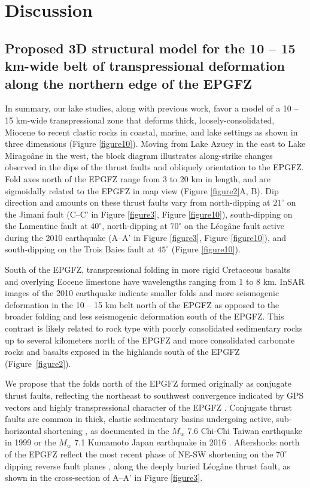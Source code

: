 \documentclass[linenumbers,draft]{agujournal}
\begin{document}
\section{Discussion}
\subsection{Proposed 3D structural model for the 10 -- 15 km-wide belt of transpressional deformation along the northern edge of the EPGFZ}
In summary, our lake studies, along with previous work, favor a model of a 10 -- 15 km-wide transpressional zone that deforms thick, loosely-consolidated, Miocene to recent clastic rocks in coastal, marine, and lake settings as shown in three dimensions (Figure \ref{figure10}). Moving from Lake Azuey in the east to Lake Mirago\^ane in the west, the block diagram illustrates along-strike changes observed in the dips of the thrust faults and obliquely orientation to the EPGFZ. Fold axes north of the EPGFZ range from 3 to 20 km in length, and are sigmoidally related to the EPGFZ in map view (Figure \ref{figure2}A, B). Dip direction and amounts on these thrust faults vary from north-dipping at $21^{\circ}$ on the Jimani fault (C--C' in Figure \ref{figure3}, Figure \ref{figure10}), south-dipping on the Lamentine fault \citep{saint2015seismotectonics} at $40^{\circ}$, north-dipping at $70^{\circ}$ on the L\'eog\^ane fault active during the 2010 earthquake (A--A' in Figure \ref{figure3}, Figure \ref{figure10}), and south-dipping on the Trois Baies fault at $45^{\circ}$ (Figure \ref{figure10}). 

South of the EPGFZ, transpressional folding in more rigid Cretaceous basalts and overlying Eocene limestone have wavelengths ranging from 1 to 8 km. InSAR images of the 2010 earthquake indicate smaller folds and more seismogenic deformation in the 10 -- 15 km belt north of the EPGFZ as opposed to the broader folding and less seismogenic deformation south of the EPGFZ. This contrast is likely related to rock type with poorly consolidated sedimentary rocks up to several kilometers north of the EPGFZ and more consolidated carbonate rocks and basalts exposed in the highlands south of the EPGFZ (Figure~\ref{figure2}).

We propose that the folds north of the EPGFZ formed originally as conjugate thrust faults, reflecting the northeast to southwest convergence indicated by GPS vectors and highly transpressional character of the EPGFZ \citep{calais2010transpressional}. Conjugate thrust faults are common in thick, clastic sedimentary basins undergoing active, sub-horizontal shortening \citep{sibson2012reverse}, as documented in the $M_w$ 7.6 Chi-Chi Taiwan earthquake in 1999 \citep{chen2002conjugate} or the $M_w$ 7.1 Kumamoto Japan earthquake in 2016 \citep{lin2017coseismic}. Aftershocks north of the EPGFZ reflect the most recent phase of NE-SW shortening on the $70^{\circ}$ dipping reverse fault planes \citep{nettles2010earthquake}, along the deeply buried L\'eog\^ane thrust fault, as shown in the cross-section of A--A' in Figure \ref{figure3}.
\end{document}
